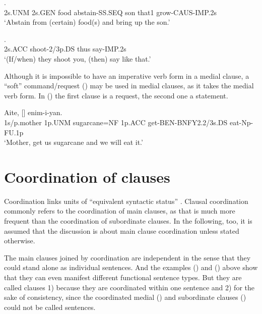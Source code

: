 \ea%
\label{ex:x1365}
   .\\
2s.UNM  2s.GEN  food  abstain-SS.SEQ  son  that1 grow-CAUS-IMP.2s\\
\glt `Abstain from (certain) food(s) and bring up the son.'  
\z


\ea%
\label{ex:x1356}
  . \\
2s.ACC  shoot-2/3p.DS  thus  say-IMP.2s      \\
\glt `(If/when) they shoot you, (then) say like that.'
\z

Although it is impossible to have an imperative verb form in a medial clause, a ``soft'' command/request () may be used in medial clauses, as it takes the medial verb form. In () the first clause is a request, the second one a statement.

\ea%
\label{ex:x1366}
\gll Aite,  [] enim-i-yan. \\
1s/p.mother  1p.UNM  sugarcane=NF  1p.ACC  get-BEN-BNFY2.2/3s.DS eat-Np-FU.1p\\
\glt `Mother, get us sugarcane and we will eat it.'
\z

\section{Coordination of clauses}
\hypertarget{RefHeading22921935131865}{}
Coordination links units of ``equivalent syntactic status'' \citep[93]{Crystal1997}. Clausal coordination commonly refers to the coordination of main clauses, as that is much more frequent than the coordination of subordinate clauses. In the following, too, it is assumed that the discussion is about main clause coordination unless stated otherwise.

The main clauses joined by coordination are independent in the sense that they could stand alone as individual sentences. And the examples () and () above show that they can even manifest different functional sentence types. But they are called clauses 1) because they are coordinated within one sentence and 2) for the sake of consistency, since the coordinated medial () and subordinate clauses () could not be called sentences.

